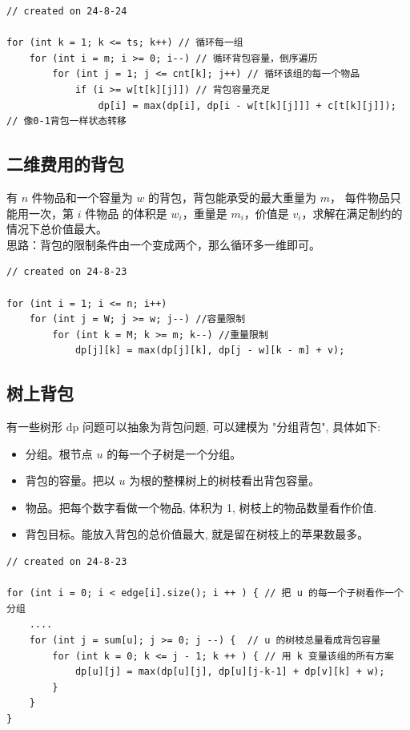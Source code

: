 \documentclass[a4paper,12pt]{article}
\begin{document}
\begin{lstlisting}
// created on 24-8-24

for (int k = 1; k <= ts; k++) // 循环每一组
    for (int i = m; i >= 0; i--) // 循环背包容量，倒序遍历
        for (int j = 1; j <= cnt[k]; j++) // 循环该组的每一个物品
            if (i >= w[t[k][j]]) // 背包容量充足
                dp[i] = max(dp[i], dp[i - w[t[k][j]]] + c[t[k][j]]); // 像0-1背包一样状态转移
\end{lstlisting}

\subsection{二维费用的背包}

\noindent 有 \(n\) 件物品和一个容量为 \(w\) 的背包，背包能承受的最大重量为 \(m\)，
每件物品只能用一次，第 \(i\) 件物品
的体积是 \(w_i\)，重量是 \(m_i\)，价值是 \(v_i\)，求解在满足制约的情况下总价值最大。
\\

\noindent 思路：背包的限制条件由一个变成两个，那么循环多一维即可。

\begin{lstlisting}
// created on 24-8-23

for (int i = 1; i <= n; i++)
    for (int j = W; j >= w; j--) //容量限制
        for (int k = M; k >= m; k--) //重量限制
            dp[j][k] = max(dp[j][k], dp[j - w][k - m] + v);    
\end{lstlisting}

\subsection{树上背包}

\noindent 有一些树形 dp 问题可以抽象为背包问题, 可以建模为 "分组背包", 具体如下:

\begin{itemize}
\item 分组。根节点 \(u\) 的每一个子树是一个分组。
\item 背包的容量。把以 \(u\) 为根的整棵树上的树枝看出背包容量。
\item 物品。把每个数字看做一个物品, 体积为 1, 树枝上的物品数量看作价值.
\item 背包目标。能放入背包的总价值最大, 就是留在树枝上的苹果数最多。
\end{itemize}

\begin{lstlisting}
// created on 24-8-23

for (int i = 0; i < edge[i].size(); i ++ ) { // 把 u 的每一个子树看作一个分组
    ....
    for (int j = sum[u]; j >= 0; j --) {  // u 的树枝总量看成背包容量
        for (int k = 0; k <= j - 1; k ++ ) { // 用 k 变量该组的所有方案
            dp[u][j] = max(dp[u][j], dp[u][j-k-1] + dp[v][k] + w);
        }
    }
}
\end{lstlisting}
\end{document}
